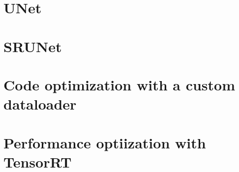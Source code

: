 \label{chap:Architectures}

\section{UNet}
\label{sec:unet}

\section{SRUNet}
\label{sec:srunet}

\section{Code optimization with a custom dataloader}
\label{sec:custom-dataloader}

\section{Performance optiization with TensorRT}
\label{sec:tensorrt}

